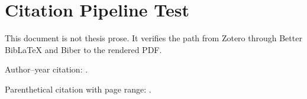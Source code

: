 \documentclass[12pt,a4paper]{article}
\begin{document}
\section*{Citation Pipeline Test}

This document is not thesis prose. It verifies the path from Zotero through
Better BibLaTeX and Biber to the rendered PDF.

Author--year citation: \textcite{shneidermanDirectManipulationStep1983}.

Parenthetical citation with page range:
\parencite[57--69]{shneidermanDirectManipulationStep1983}.

\printbibliography[title={Test Bibliography}]
\end{document}
